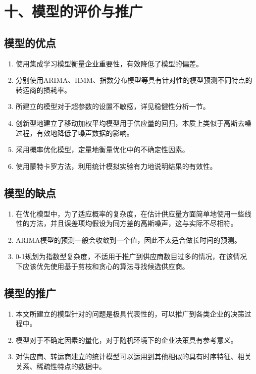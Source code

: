 \documentclass{my_paper}
\begin{document}
\section{十、模型的评价与推广}

\iffalse
注：本部分的标题需要根据你的内容进行调整，例如：如果你没有写模型推广的话，就直接把标题写成模型的评价与改进。很多论文也把这部分的内容直接统称为“模型评价”部分，也是可以的。
\fi 

\subsection{模型的优点}

\begin{enumerate}
\item 使用集成学习模型衡量企业重要性，有效降低了模型的偏差。
\item 分别使用ARIMA、HMM、指数分布模型等具有针对性的模型预测不同特点的转运商的损耗率。
\item 所建立的模型对于超参数的设置不敏感，详见稳健性分析一节。
\item 创新型地建立了移动加权平均模型用于供应量的回归，本质上类似于高斯去噪过程\cite{gonzale2002digital}，有效地降低了噪声数据的影响。
\item 采用概率优化模型，定量地衡量优化中的不确定性因素。
\item 使用蒙特卡罗方法，利用统计模拟实验有力地说明结果的有效性。

\end{enumerate}
\subsection{模型的缺点}
\begin{enumerate}
	\item 在优化模型中，为了适应概率的复杂度，在估计供应量方面简单地使用一些线性的方法，并且误差项均假设为同方差的高斯噪声，这与实际不尽相符。
	\item ARIMA模型的预测一般会收敛到一个值，因此不太适合做长时间的预测。
	\item 0-1规划为指数型复杂度，不适用于推广到供应商数目过多的情况，在该情况下应该优先使用基于剪枝和贪心的算法寻找候选供应商。
	
\end{enumerate}

\subsection{模型的推广}
\begin{enumerate}

\item 本文所建立的模型针对的问题是极具代表性的，可以推广到各类企业的决策过程中。
\item 模型对于不确定因素的量化，对于随机环境下的企业决策具有参考意义。
\item 对供应商、转运商建立的统计模型可以运用到其他相似的具有时序特征、相关关系、稀疏性特点的数据中。
\end{enumerate}
\end{document}
